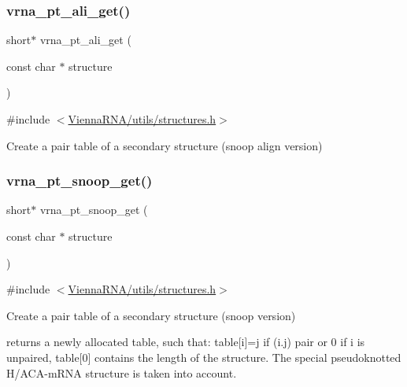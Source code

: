 \subsubsection{\texorpdfstring{vrna\_pt\_ali\_get()}{vrna\_pt\_ali\_get()}}
{\footnotesize\ttfamily short$\ast$ vrna\+\_\+pt\+\_\+ali\+\_\+get (\begin{DoxyParamCaption}\item[{const char $\ast$}]{structure }\end{DoxyParamCaption})}



{\ttfamily \#include $<$\mbox{\hyperlink{utils_2structures_8h}{Vienna\+R\+N\+A/utils/structures.\+h}}$>$}



Create a pair table of a secondary structure (snoop align version) 

\mbox{\label{group__struct__utils__pair__table_gaef0f7e1a6c00c81a349973de53039dda}} 
\subsubsection{\texorpdfstring{vrna\_pt\_snoop\_get()}{vrna\_pt\_snoop\_get()}}
{\footnotesize\ttfamily short$\ast$ vrna\+\_\+pt\+\_\+snoop\+\_\+get (\begin{DoxyParamCaption}\item[{const char $\ast$}]{structure }\end{DoxyParamCaption})}



{\ttfamily \#include $<$\mbox{\hyperlink{utils_2structures_8h}{Vienna\+R\+N\+A/utils/structures.\+h}}$>$}



Create a pair table of a secondary structure (snoop version) 

returns a newly allocated table, such that\+: table\mbox{[}i\mbox{]}=j if (i.\+j) pair or 0 if i is unpaired, table\mbox{[}0\mbox{]} contains the length of the structure. The special pseudoknotted H/\+A\+C\+A-\/m\+R\+NA structure is taken into account. \mbox{\label{group__struct__utils__pair__table_gae8f31c859b48f97b8af889e914e4d040}} 
